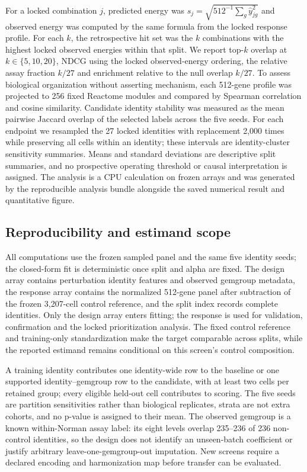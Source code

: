 \documentclass[10pt]{article}
\begin{document}
For a locked combination $j$, predicted energy was $s_j=\sqrt{512^{-1}\sum_g\hat{y}_{jg}^{2}}$ and observed energy was computed by the same formula from the locked response profile. For each $k$, the retrospective hit set was the $k$ combinations with the highest locked observed energies within that split. We report top-$k$ overlap at $k\in\{5,10,20\}$, NDCG using the locked observed-energy ordering, the relative assay fraction $k/27$ and enrichment relative to the null overlap $k/27$. To assess biological organization without asserting mechanism, each 512-gene profile was projected to 256 fixed Reactome modules and compared by Spearman correlation and cosine similarity. Candidate identity stability was measured as the mean pairwise Jaccard overlap of the selected labels across the five seeds. For each endpoint we resampled the 27 locked identities with replacement 2,000 times while preserving all cells within an identity; these intervals are identity-cluster sensitivity summaries. Means and standard deviations are descriptive split summaries, and no prospective operating threshold or causal interpretation is assigned. The analysis is a CPU calculation on frozen arrays and was generated by the reproducible analysis bundle alongside the saved numerical result and quantitative figure.

\subsection{Reproducibility and estimand scope}
All computations use the frozen sampled panel and the same five identity seeds; the closed-form fit is deterministic once split and alpha are fixed. The design array contains perturbation identity features and observed gemgroup metadata, the response array contains the normalized 512-gene panel after subtraction of the frozen 3,207-cell control reference, and the split index records complete identities. Only the design array enters fitting; the response is used for validation, confirmation and the locked prioritization analysis. The fixed control reference and training-only standardization make the target comparable across splits, while the reported estimand remains conditional on this screen's control composition.

A training identity contributes one identity-wide row to the baseline or one supported identity--gemgroup row to the candidate, with at least two cells per retained group; every eligible held-out cell contributes to scoring. The five seeds are partition sensitivities rather than biological replicates, strata are not extra cohorts, and no p-value is assigned to their mean. The observed gemgroup is a known within-Norman assay label: its eight levels overlap 235--236 of 236 non-control identities, so the design does not identify an unseen-batch coefficient or justify arbitrary leave-one-gemgroup-out imputation. New screens require a declared encoding and harmonization map before transfer can be evaluated.
\end{document}
